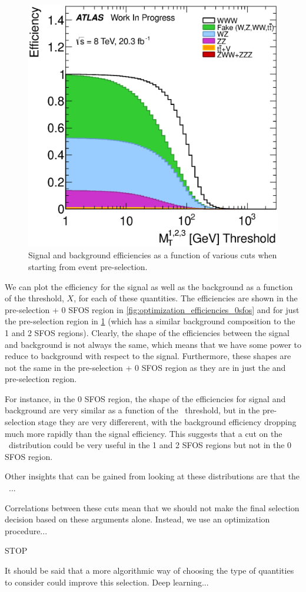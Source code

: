 \begin{figure}[ht!]
\includegraphics[width=0.3\columnwidth]{figures/optimization/SignalRegions_0p5mmZ0_Preselection_Efficiencies/ThreeLeptonMt_Cumulative.eps}
\caption{Signal and background efficiencies as a function of various cuts when starting from event pre-selection.}
\label{fig:optimization_efficiencies_preselection}
\end{figure}

We can plot the efficiency for the signal as well as the background
as a function of the threshold, $X$, for each of these quantities. 
The efficiencies are shown in the pre-selection + 0 SFOS region
in \fig\ref{fig:optimization_efficiencies_0sfos} and for
just the pre-selection region in 
\fig\ref{fig:optimization_efficiencies_preselection} (which
has a similar background composition to the 1 and 2 SFOS regions).
Clearly, the shape of the efficiencies between the signal and
background is not always the same, which means that we have some
power to reduce to background with respect to the signal.
Furthermore, these shapes are not the same in the pre-selection 
+ 0 SFOS region as they are in just the and pre-selection region.

For instance, in the 0 SFOS region, the shape of the efficiencies
for signal and background are very similar as a function
of the \MET~threshold, but in the pre-selection stage they are
very differerent, with the background efficiency dropping much
more rapidly than the signal efficiency. This suggests that
a cut on the \MET~distribution could be very useful 
in the 1 and 2 SFOS regions but not in the 0 SFOS region.

Other insights that can be gained from looking at these distributions
are that the \deltaphi~...


Correlations between these cuts mean that we should not make the final
selection decision based on these arguments alone. 
Instead, we use an optimization procedure...

STOP



It should be said that a more algorithmic way of choosing the type
of quantities to consider could improve this selection. Deep learning...





